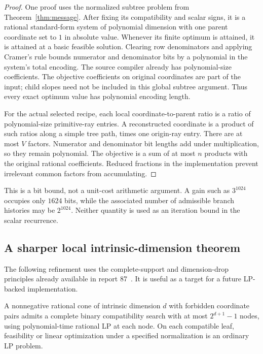 \begin{proof}
One proof uses the normalized subtree problem from
Theorem~\ref{thm:message}. After fixing its compatibility and scalar signs, it
is a rational standard-form system of polynomial dimension with one parent
coordinate set to $1$ in absolute value. Whenever its finite optimum is
attained, it is attained at a basic feasible solution. Clearing row denominators
and applying Cramer's rule bounds numerator and denominator bits by a polynomial
in the system's total encoding. The source compiler already has polynomial-size
coefficients. The objective coefficients on original coordinates are part of
the input; child slopes need not be included in this global subtree argument.
Thus every exact optimum value has polynomial encoding length.

For the actual selected recipe, each local coordinate-to-parent ratio is a
ratio of polynomial-size primitive-ray entries. A reconstructed coordinate is
a product of such ratios along a simple tree path, times one origin-ray entry.
There are at most $V$ factors. Numerator and denominator bit lengths add under
multiplication, so they remain polynomial. The objective is a sum of at most
$n$ products with the original rational coefficients. Reduced fractions in the
implementation prevent irrelevant common factors from accumulating.
\end{proof}

This is a bit bound, not a unit-cost arithmetic argument. A gain such as
$3^{1024}$ occupies only $1624$ bits, while the associated number of admissible
branch histories may be $2^{1024}$. Neither quantity is used as an iteration
bound in the scalar recurrence.

\subsection{A sharper local intrinsic-dimension theorem}

The following refinement uses the complete-support and dimension-drop principles
already available in report 87~\cite{repo87}. It is useful as a target for a
future LP-backed implementation.

\begin{lemma}
\label{lem:dimensioncover}
A nonnegative rational cone of intrinsic dimension $d$ with forbidden coordinate
pairs admits a complete binary compatibility search with at most
$2^{d+1}-1$ nodes, using polynomial-time rational LP at each node. On each
compatible leaf, feasibility or linear optimization under a specified
normalization is an ordinary LP problem.
\end{lemma}

